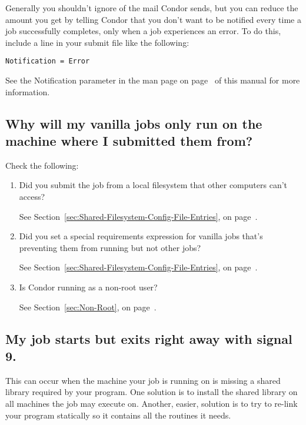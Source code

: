Generally you shouldn't ignore  of the mail Condor sends,
but you can reduce the amount you get by telling Condor that you don't
want to be notified every time a job successfully completes, only when
a job experiences an error.
To do this, include a line in your submit file like the following:

\begin{verbatim}Notification = Error\end{verbatim}

See the Notification parameter in the  man page on
page~\pageref{man-condor-submit-notification} of this manual for more
information.

\subsection{Why will my vanilla jobs only run on the machine where I
submitted them from?}

Check the following:
\begin {enumerate}

\item{Did you submit the job from a local filesystem that other
computers can't access?}

See Section~\ref{sec:Shared-Filesystem-Config-File-Entries}, on
page~\pageref{sec:Shared-Filesystem-Config-File-Entries}.

\item{Did you set a special requirements expression for 
vanilla jobs that's preventing them from running but not other jobs?}

See Section~\ref{sec:Shared-Filesystem-Config-File-Entries}, on
page~\pageref{sec:Shared-Filesystem-Config-File-Entries}.

\item{Is Condor running as a non-root user?}

See Section~\ref{sec:Non-Root}, on page~\pageref{sec:Non-Root}.

\end{enumerate}

\subsection{My job starts but exits right away with signal 9.}


This can occur when the machine your job is running on is missing a
shared library required by your program.
One solution is to install the shared library on all machines the job
may execute on.
Another, easier, solution is to try to re-link your program statically
so it contains all the routines it needs.

